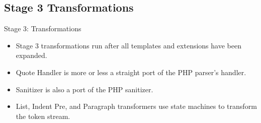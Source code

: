 \documentclass[t,xcolor=dvipsnames]{beamer}
\begin{document}
\subsection{Stage 3 Transformations}

\begin{frame}{Stage 3: Transformations}

\vspace*{-0.1in}
\begin{figure}
  \hspace*{-0.2in}
\end{figure}

\begin{itemize}
\item Stage 3 transformations run after all templates and extensions have been expanded.
\item Quote Handler is more or less a straight port of the PHP parser's handler.
\item Sanitizer is also a port of the PHP sanitizer.
\item List, Indent Pre, and Paragraph transformers use state machines to transform the token stream.
\end{itemize}

\end{frame}
\end{document}
